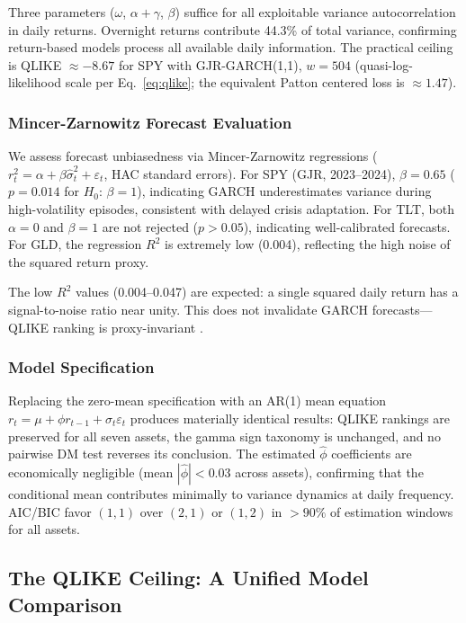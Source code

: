 Three parameters ($\omega$, $\alpha+\gamma$, $\beta$) suffice for all exploitable variance autocorrelation in daily returns. Overnight returns contribute 44.3\% of total variance, confirming return-based models process all available daily information. The practical ceiling is QLIKE $\approx -8.67$ for SPY with GJR-GARCH(1,1), $w = 504$ (quasi-log-likelihood scale per Eq.~\eqref{eq:qlike}; the equivalent Patton centered loss is $\approx 1.47$).

\subsubsection{Mincer-Zarnowitz Forecast Evaluation}

We assess forecast unbiasedness via Mincer-Zarnowitz regressions ($r^2_t = \alpha + \beta \hat{\sigma}^2_t + \varepsilon_t$, HAC standard errors). For SPY (GJR, 2023--2024), $\beta = 0.65$ ($p = 0.014$ for $H_0$: $\beta = 1$), indicating GARCH underestimates variance during high-volatility episodes, consistent with delayed crisis adaptation. For TLT, both $\alpha = 0$ and $\beta = 1$ are not rejected ($p > 0.05$), indicating well-calibrated forecasts. For GLD, the regression $R^2$ is extremely low (0.004), reflecting the high noise of the squared return proxy.

The low $R^2$ values (0.004--0.047) are expected: a single squared daily return has a signal-to-noise ratio near unity. This does not invalidate GARCH forecasts---QLIKE ranking is proxy-invariant \citep{patton2011}.

\subsubsection{Model Specification}
\label{sec:model_spec_robustness}

Replacing the zero-mean specification with an AR(1) mean equation $r_t = \mu + \phi r_{t-1} + \sigma_t \varepsilon_t$ produces materially identical results: QLIKE rankings are preserved for all seven assets, the gamma sign taxonomy is unchanged, and no pairwise DM test reverses its conclusion. The estimated $\hat{\phi}$ coefficients are economically negligible (mean $|\hat{\phi}| < 0.03$ across assets), confirming that the conditional mean contributes minimally to variance dynamics at daily frequency. AIC/BIC favor $(1,1)$ over $(2,1)$ or $(1,2)$ in $>90\%$ of estimation windows for all assets.

\subsection{The QLIKE Ceiling: A Unified Model Comparison}
\label{sec:qlike_ceiling}

